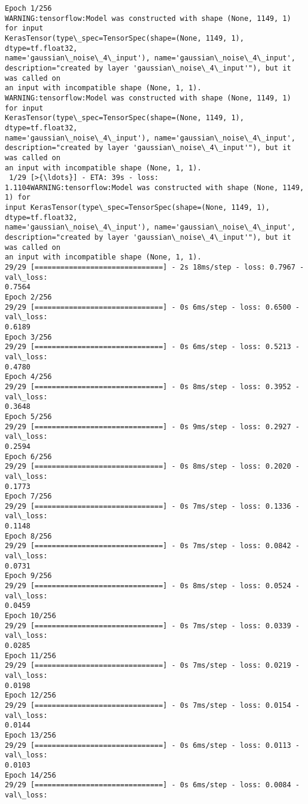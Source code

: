 \documentclass[11pt]{article}
\begin{document}
    \begin{Verbatim}[commandchars=\\\{\}]
Epoch 1/256
WARNING:tensorflow:Model was constructed with shape (None, 1149, 1) for input
KerasTensor(type\_spec=TensorSpec(shape=(None, 1149, 1), dtype=tf.float32,
name='gaussian\_noise\_4\_input'), name='gaussian\_noise\_4\_input',
description="created by layer 'gaussian\_noise\_4\_input'"), but it was called on
an input with incompatible shape (None, 1, 1).
WARNING:tensorflow:Model was constructed with shape (None, 1149, 1) for input
KerasTensor(type\_spec=TensorSpec(shape=(None, 1149, 1), dtype=tf.float32,
name='gaussian\_noise\_4\_input'), name='gaussian\_noise\_4\_input',
description="created by layer 'gaussian\_noise\_4\_input'"), but it was called on
an input with incompatible shape (None, 1, 1).
 1/29 [>{\ldots}] - ETA: 39s - loss:
1.1104WARNING:tensorflow:Model was constructed with shape (None, 1149, 1) for
input KerasTensor(type\_spec=TensorSpec(shape=(None, 1149, 1), dtype=tf.float32,
name='gaussian\_noise\_4\_input'), name='gaussian\_noise\_4\_input',
description="created by layer 'gaussian\_noise\_4\_input'"), but it was called on
an input with incompatible shape (None, 1, 1).
29/29 [==============================] - 2s 18ms/step - loss: 0.7967 - val\_loss:
0.7564
Epoch 2/256
29/29 [==============================] - 0s 6ms/step - loss: 0.6500 - val\_loss:
0.6189
Epoch 3/256
29/29 [==============================] - 0s 6ms/step - loss: 0.5213 - val\_loss:
0.4780
Epoch 4/256
29/29 [==============================] - 0s 8ms/step - loss: 0.3952 - val\_loss:
0.3648
Epoch 5/256
29/29 [==============================] - 0s 9ms/step - loss: 0.2927 - val\_loss:
0.2594
Epoch 6/256
29/29 [==============================] - 0s 8ms/step - loss: 0.2020 - val\_loss:
0.1773
Epoch 7/256
29/29 [==============================] - 0s 7ms/step - loss: 0.1336 - val\_loss:
0.1148
Epoch 8/256
29/29 [==============================] - 0s 7ms/step - loss: 0.0842 - val\_loss:
0.0731
Epoch 9/256
29/29 [==============================] - 0s 8ms/step - loss: 0.0524 - val\_loss:
0.0459
Epoch 10/256
29/29 [==============================] - 0s 7ms/step - loss: 0.0339 - val\_loss:
0.0285
Epoch 11/256
29/29 [==============================] - 0s 7ms/step - loss: 0.0219 - val\_loss:
0.0198
Epoch 12/256
29/29 [==============================] - 0s 7ms/step - loss: 0.0154 - val\_loss:
0.0144
Epoch 13/256
29/29 [==============================] - 0s 6ms/step - loss: 0.0113 - val\_loss:
0.0103
Epoch 14/256
29/29 [==============================] - 0s 6ms/step - loss: 0.0084 - val\_loss:

\end{Verbatim}
\end{document}
